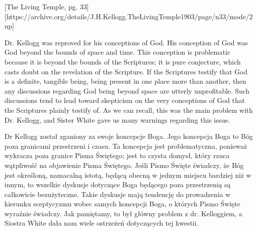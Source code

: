 [The Living Temple, pg. 33][https://archive.org/details/J.H.Kellogg.TheLivingTemple1903/page/n33/mode/2up]


Dr. Kellogg was reproved for his conceptions of God. His conception of God was God beyond the bounds of space and time. This conception is problematic because it is beyond the bounds of the Scriptures; it is pure conjecture, which casts doubt on the revelation of the Scripture. If the Scriptures testify that God is a definite, tangible being, being present in one place more than another, then any discussions regarding God being beyond space are utterly unprofitable. Such discussions tend to lead toward skepticism on the very conceptions of God that the Scriptures plainly testify of. As we can recall, this was the main problem with Dr. Kellogg, and Sister White gave us many warnings regarding this issue.


Dr Kellogg został zganiony za swoje koncepcje Boga. Jego koncepcja Boga to Bóg poza granicami przestrzeni i czasu. Ta koncepcja jest problematyczna, ponieważ wykracza poza granice Pisma Świętego; jest to czysta domysł, który rzuca wątpliwość na objawienie Pisma Świętego. Jeśli Pismo Święte świadczy, że Bóg jest określoną, namacalną istotą, będącą obecną w jednym miejscu bardziej niż w innym, to wszelkie dyskusje dotyczące Boga będącego poza przestrzenią są całkowicie bezużyteczne. Takie dyskusje mają tendencję do prowadzenia w kierunku sceptycyzmu wobec samych koncepcji Boga, o których Pismo Święte wyraźnie świadczy. Jak pamiętamy, to był główny problem z dr. Kelloggiem, a Siostra White dała nam wiele ostrzeżeń dotyczących tej kwestii.


